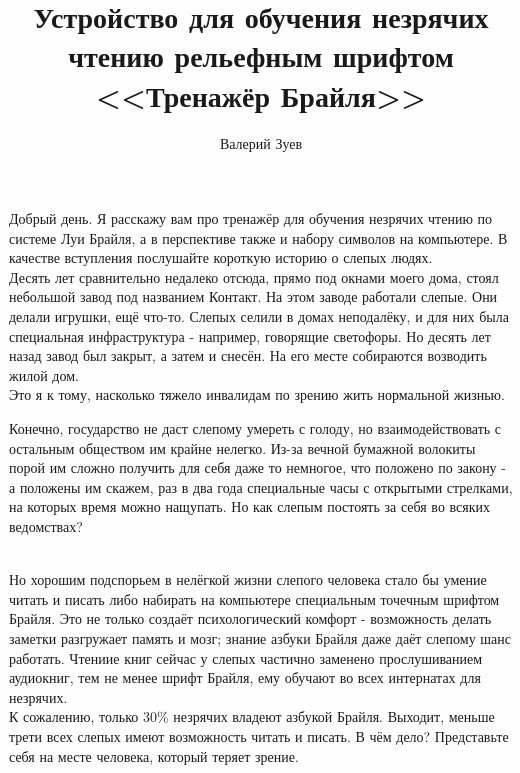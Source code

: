 \documentclass[a4paper,12pt]{article} %
\begin{document}
\title{Устройство для обучения незрячих чтению рельефным шрифтом <<Тренажёр Брайля>>}
\author{Валерий Зуев}
\maketitle
Добрый день. Я расскажу вам про тренажёр для обучения незрячих чтению по системе Луи Брайля, а в перспективе также и набору символов на компьютере. В качестве вступления послушайте короткую историю о слепых людях. \\
Десять лет сравнительно недалеко отсюда, прямо под окнами моего дома, стоял небольшой завод под названием Контакт. На этом заводе работали слепые. Они делали игрушки, ещё что-то. Слепых селили в домах неподалёку, и для них была специальная инфраструктура - например, говорящие светофоры. Но десять лет назад завод был закрыт, а затем и снесён. На его месте собираются возводить жилой дом.\\
Это  я к тому, насколько тяжело инвалидам по зрению жить нормальной жизнью.\begin{footnotesize}
Конечно, государство не даст слепому умереть с голоду, но взаимодействовать с остальным обществом им крайне нелегко. Из-за вечной бумажной волокиты порой им сложно получить для себя даже то немногое, что положено по закону - а положены им скажем, раз в два года специальные часы с открытыми стрелками, на которых время можно нащупать. Но как слепым постоять за себя во всяких ведомствах? 
\end{footnotesize}\\
Но хорошим подспорьем в нелёгкой жизни слепого человека стало бы умение читать и писать либо набирать на компьютере специальным точечным шрифтом Брайля. Это не только создаёт психологический комфорт - возможность делать заметки разгружает память и мозг; знание азбуки Брайля даже даёт слепому шанс работать.
\footnotesize
Чтениие книг сейчас у слепых частично заменено прослушиванием аудиокниг, тем не менее шрифт Брайля, ему обучают во всех интернатах для незрячих. 
\normalsize \\
К сожалению, только 30\% незрячих владеют азбукой Брайля. Выходит, меньше трети всех слепых имеют возможность читать и писать. В чём дело? Представьте себя на месте человека, который теряет зрение. 
\end{document}
